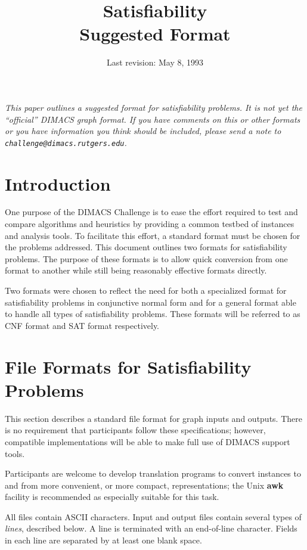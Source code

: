 \documentclass[12pt]{article}
\title{Satisfiability\\Suggested Format}
\author{}
\date{Last revision: May 8, 1993}
\begin{document}
\maketitle
{\narrower\it This paper outlines a suggested format for
satisfiability problems.  It is not
yet the ``official'' DIMACS graph format.  If you have comments on
this or other formats or you have information you think should be
included, please send a note to {\tt challenge@dimacs.rutgers.edu}.}

\section{Introduction}
One purpose of the DIMACS Challenge is to ease the effort required to
test and compare algorithms and heuristics by providing a common
testbed of instances and analysis tools.  To facilitate this effort, a
standard format must be chosen for the problems addressed.  This
document outlines two formats for satisfiability problems.  The
purpose of these formats is to allow quick conversion from one format
to another while still being reasonably effective formats directly.

Two formats were chosen to reflect the need for both a specialized
format for satisfiability problems in conjunctive normal form and for
a general format able to handle all types of satisfiability problems.
These formats will be referred to as CNF format and SAT format respectively.

\section{File Formats for Satisfiability Problems} 

This section describes a standard file format for graph inputs and outputs. 
There is no  requirement that participants follow these specifications;
however, compatible implementations will be able to make full use of 
DIMACS support tools.  

Participants are welcome to develop translation programs to convert
instances to and from more convenient, or more compact, representations;
the Unix {\bf awk} facility is recommended as especially suitable
for this task.   

All files contain ASCII characters.  Input and output files contain
several types of {\em lines}, described below.  A line is terminated
with an end-of-line character.  Fields in each line are separated by
at least one blank space.  
\end{document}
